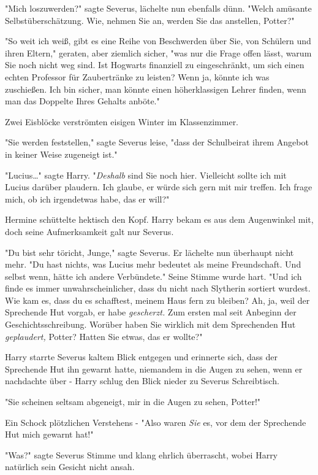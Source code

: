 {"Mich loszuwerden?" sagte Severus, lächelte nun ebenfalls dünn. "Welch amüsante Selbstüberschätzung. Wie, nehmen Sie an, werden Sie das anstellen, Potter?"

"So weit ich weiß, gibt es eine Reihe von Beschwerden über Sie, von Schülern und ihren Eltern," geraten, aber ziemlich sicher, "was nur die Frage offen lässt, warum Sie noch nicht weg sind. Ist Hogwarts finanziell zu eingeschränkt, um sich einen echten Professor für Zaubertränke zu leisten? Wenn ja, könnte ich was zuschießen. Ich bin sicher, man könnte einen höherklassigen Lehrer finden, wenn man das Doppelte Ihres Gehalts anböte."

Zwei Eisblöcke verströmten eisigen Winter im Klassenzimmer.

"Sie werden feststellen," sagte Severus leise, "dass der Schulbeirat ihrem Angebot in keiner Weise zugeneigt ist."

"Lucius…" sagte Harry. "\emph{Deshalb} sind Sie noch hier. Vielleicht sollte ich mit Lucius darüber plaudern. Ich glaube, er würde sich gern mit mir treffen. Ich frage mich, ob ich irgendetwas habe, das er will?"

Hermine schüttelte hektisch den Kopf. Harry bekam es aus dem Augenwinkel mit, doch seine Aufmerksamkeit galt nur Severus.

"Du bist sehr töricht, Junge," sagte Severus. Er lächelte nun überhaupt nicht mehr. "Du hast nichts, was Lucius mehr bedeutet als meine Freundschaft. Und selbst wenn, hätte ich andere Verbündete." Seine Stimme wurde hart. "Und ich finde es immer unwahrscheinlicher, dass du nicht nach Slytherin sortiert wurdest. Wie kam es, dass du es schafftest, meinem Haus fern zu bleiben? Ah, ja, weil der Sprechende Hut vorgab, er habe \emph{gescherzt.} Zum ersten mal seit Anbeginn der Geschichtsschreibung. Worüber haben Sie wirklich mit dem Sprechenden Hut \emph{geplaudert,} Potter? Hatten Sie etwas, das er wollte?"

Harry starrte Severus kaltem Blick entgegen und erinnerte sich, dass der Sprechende Hut ihn gewarnt hatte, niemandem in die Augen zu sehen, wenn er nachdachte über - Harry schlug den Blick nieder zu Severus Schreibtisch.

"Sie scheinen seltsam abgeneigt, mir in die Augen zu sehen, Potter!"

Ein Schock plötzlichen Verstehens - "Also waren \emph{Sie} es, vor dem der Sprechende Hut mich gewarnt hat!"

"Was?" sagte Severus Stimme und klang ehrlich überrascht, wobei Harry natürlich sein Gesicht nicht ansah.

}
